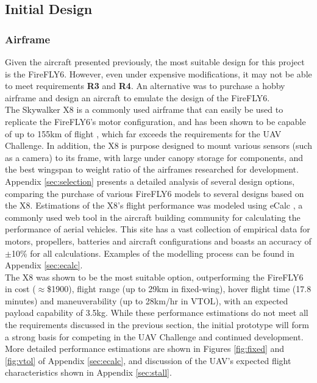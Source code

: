 \subsection{Initial Design}
\subsubsection*{Airframe}
Given the aircraft presented previously, the most suitable design for this project is the FireFLY6. However, even under expensive modifications, it may not be able to meet requirements \textbf{R3} and \textbf{R4}. An alternative was to purchase a hobby airframe and design an aircraft to emulate the design of the FireFLY6.\\

The Skywalker X8 \cite{ref:x8} is a commonly used airframe that can easily be used to replicate the FireFLY6's motor configuration, and has been shown to be capable of up to 155km of flight \cite{ref:range}, which far exceeds the requirements for the UAV Challenge. In addition, the X8 is purpose designed to mount various sensors (such as a camera) to its frame, with large under canopy storage for components, and the best wingspan to weight ratio of the airframes researched for development.\\

Appendix \ref{sec:selection} presents a detailed analysis of several design options, comparing the purchase of various FireFLY6 models to several designs based on the X8. Estimations of the X8's flight performance was modeled using eCalc \cite{ref:ecalc}, a commonly used web tool in the aircraft building community for calculating the performance of aerial vehicles. This site has a vast collection of empirical data for motors, propellers, batteries and aircraft configurations and boasts an accuracy of $\pm$10\% for all calculations. Examples of the modelling process can be found in Appendix \ref{sec:ecalc}.\\

The X8 was shown to be the most suitable option, outperforming the FireFLY6 in cost ($\approx$\$1900), flight range (up to 29km in fixed-wing), hover flight time (17.8 minutes) and maneuverability (up to 28km/hr in VTOL), with an expected payload capability of 3.5kg. While these performance estimations do not meet all the requirements discussed in the previous section, the initial prototype will form a strong basis for competing in the UAV Challenge and continued development. More detailed performance estimations are shown in Figures \ref{fig:fixed} and \ref{fig:vtol} of Appendix \ref{sec:ecalc}, and discussion of the UAV's expected flight characteristics shown in Appendix \ref{sec:stall}.

